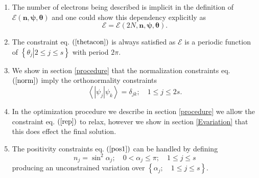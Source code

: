 \documentclass[aps,preprint]{revtex4}%
\begin{document}
\begin{enumerate}
\item The number of electrons being described is implicit in the definition of
$\mathcal{E}\left(  \mathbf{n,\psi,\theta}\right)  $ and one could show this
dependency explicitly as
\begin{equation}
\mathcal{E}=\mathcal{E}\left(  2N,\mathbf{n,\psi,\theta}\right)  .
\end{equation}


\item The constraint eq. $\left(  \ref{thetacon}\right)  $ is always satisfied
as $\mathcal{E}$ is a periodic function of $\left\{  \left.  \theta
_{j}\right\vert 2\leq j\leq s\right\}  $ with period $2\pi.$

\item We show in section \ref{procedure} that the normalization constraints
eq. $\left(  \ref{norm}\right)  $ imply the orthonormality constraints
\begin{equation}
\left\langle \left\vert \psi_{j}\right\vert \psi_{k}\right\rangle =\delta
_{jk};\quad1\leq j\leq2s.
\end{equation}


\item In the optimization procedure we describe in section \ref{procedure} we
allow the constraint eq. $\left(  \ref{rep}\right)  $ to relax, however we
show in section \ref{Evariation} that this does effect the final solution.

\item The positivity constraints eq. $\left(  \ref{pos1}\right)  $ can be
handled by defining
\begin{equation}
n_{j}=\sin^{2}\alpha_{j};\quad0<\alpha_{j}\leq\pi;\quad1\leq j\leq s
\end{equation}
producing an unconstrained variation over $\left\{  \alpha_{j};\quad1\leq
j\leq s\right\}  $.
\end{enumerate}
\end{document}
